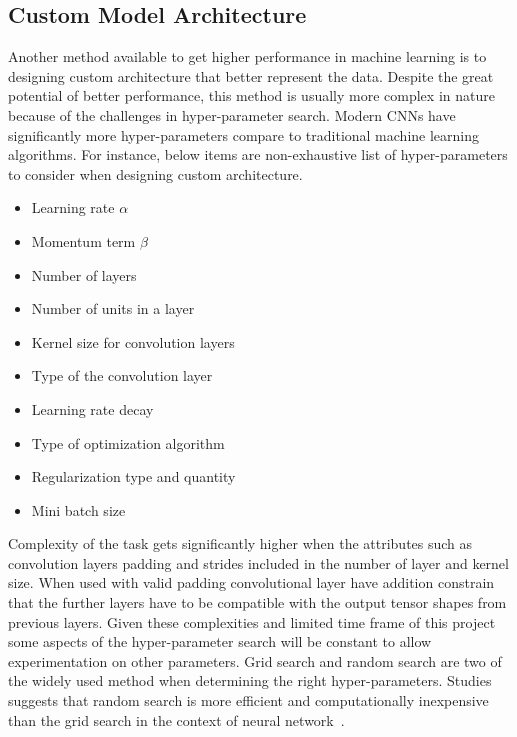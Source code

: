 \subsection{Custom Model Architecture}
Another method available to get higher performance in machine learning is to designing custom architecture that better represent the data.
Despite the great potential of better performance, this method is usually more complex in nature because of the challenges in hyper-parameter search.
Modern CNNs have significantly more hyper-parameters compare to traditional machine learning algorithms. 
For instance, below items are non-exhaustive list of hyper-parameters to consider when designing custom architecture.

\begin{itemize}
    \item Learning rate $\alpha$
    \item Momentum term $\beta$
    \item Number of layers
    \item Number of units in a layer
    \item Kernel size for convolution layers
    \item Type of the convolution layer
    \item Learning rate decay
    \item Type of optimization algorithm
    \item Regularization type and quantity
    \item Mini batch size
\end{itemize}

Complexity of the task gets significantly higher when the attributes such as convolution layers padding and strides included in the number of layer and kernel size.
When used with valid padding convolutional layer have addition constrain that the further layers have to be compatible with the output tensor shapes from previous layers.
Given these complexities and limited time frame of this project some aspects of the hyper-parameter search will be constant to allow experimentation on other parameters.
Grid search and random search are two of the widely used method when determining the right hyper-parameters.
Studies suggests that random search is more efficient and computationally inexpensive than the grid search in the context of neural network~\cite{randomsearch}.

